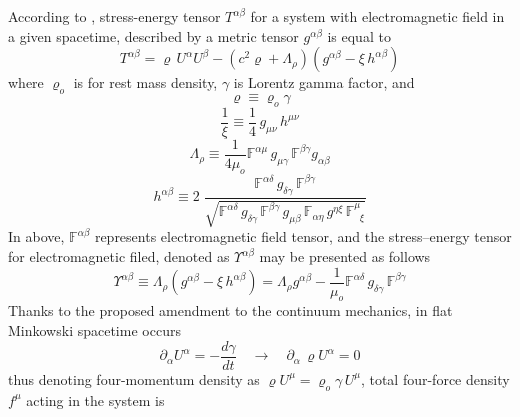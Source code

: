 \documentclass[aps,prx,preprint,groupedaddress,showkeys]{revtex4-2}
\newcommand{\mdt}[1] {\frac{d {#1}}{dt}}
\begin{document}
According to \cite{PMofC}, stress-energy tensor $T^{\alpha \beta}$ for a system with electromagnetic field in a given spacetime, described by a metric tensor $g^{\alpha \beta}$ is equal to
\begin{equation} \label{CH2}
T^{\alpha \beta} =  \varrho \, U^{\alpha} U^{\beta} - \left ( c^2 \varrho +  \Lambda_{\rho}  \right ) \left ( g^{\alpha \beta} - \xi \, h^{\alpha \beta} \right )
\end{equation}
where $\varrho_o$ is for rest mass density, $\gamma$ is Lorentz gamma factor, and
\begin{equation} \label{VRD}
\varrho \equiv \varrho_o \gamma
\end{equation}
\begin{equation} \label{CH4}
\frac{1}{\xi} \equiv \frac{1}{4}\, g_{\mu \nu} \, h^{\mu \nu}
\end{equation}
\begin{equation} \label{CH5}
\Lambda_{\rho} \equiv \frac{1}{4\mu_o} \mathbb{F}^{\alpha \mu} \, g_{\mu \gamma} \, \mathbb{F}^{ \beta \gamma } g_{\alpha \beta}
\end{equation}
\begin{equation} \label{CH6}
h^{\alpha \beta} \equiv 2 \; \frac{\mathbb{F}^{\alpha \delta} \, g_{\delta \gamma} \, \mathbb{F}^{ \beta \gamma } }{ \sqrt{\mathbb{F}^{\alpha \delta} \, g_{\delta \gamma} \, \mathbb{F}^{ \beta \gamma } \, g_{\mu \beta} \, \mathbb{F}_{\alpha \eta} \, g^{\eta \xi} \, \mathbb{F}^{\mu}_{\; \; \xi }}}
\end{equation}
In above, $\mathbb{F}^{\alpha \beta}$ represents electromagnetic field tensor, and the stress–energy tensor for electromagnetic filed, denoted as $\Upsilon^{\alpha \beta}$ may be presented as follows
\begin{equation} \label{CH7}
\Upsilon^{\alpha \beta} \equiv  \Lambda_{\rho} \left (g^{\alpha \beta} - \xi \, h^{\alpha \beta}  \right ) = \Lambda_{\rho} g^{\alpha \beta} - \frac{1}{\mu_o}\mathbb{F}^{\alpha \delta} \, g_{\delta \gamma} \, \mathbb{F}^{ \beta \gamma }
\end{equation}
Thanks to the proposed amendment to the continuum mechanics, in flat Minkowski spacetime occurs
\begin{equation} \label{CH1}
\partial_{\alpha} U^{\alpha} = -\mdt{\gamma}  \quad \to \quad \partial_{\alpha} \, \varrho U^{\alpha} = 0
\end{equation}
thus denoting four-momentum density as $\varrho U^{\mu} = \varrho_o \gamma \, U^{\mu}$, total four-force density $f^{\mu}$ acting in the system is
\end{document}
